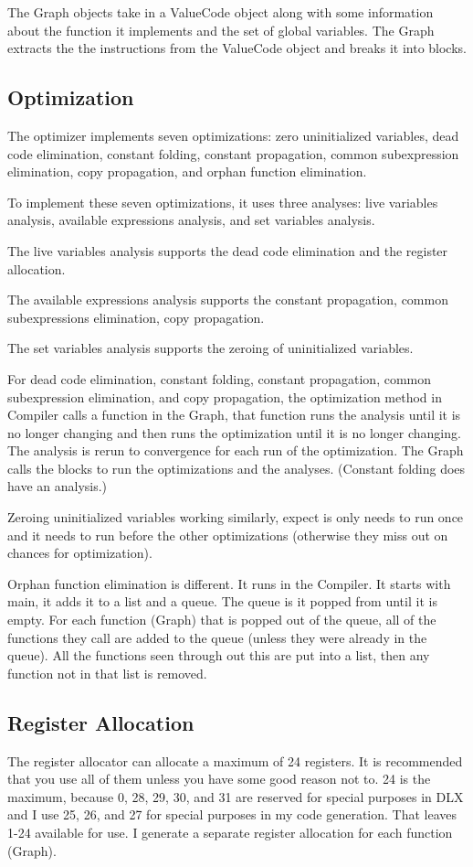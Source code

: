 The Graph objects take in a ValueCode object along with some information about the function it implements and the set of global variables. The Graph extracts the the instructions from the ValueCode object and breaks it into blocks. 

\subsection*{Optimization}
The optimizer implements seven optimizations: zero uninitialized variables, dead code elimination, constant folding, constant propagation, common subexpression elimination, copy propagation, and orphan function elimination. 

To implement these seven optimizations, it uses three analyses: live variables analysis, available expressions analysis, and set variables analysis. 

The live variables analysis supports the dead code elimination and the register allocation. 

The available expressions analysis supports the constant propagation, common subexpressions elimination, copy propagation. 

The set variables analysis supports the zeroing of uninitialized variables. 

For dead code elimination, constant folding, constant propagation, common subexpression elimination, and copy propagation, the optimization method in Compiler calls a function in the Graph, that function runs the analysis until it is no longer changing and then runs the optimization until it is no longer changing. The analysis is rerun to convergence for each run of the optimization. The Graph calls the blocks to run the optimizations and the analyses. (Constant folding does have an analysis.) 

Zeroing uninitialized variables working similarly, expect is only needs to run once and it needs to run before the other optimizations (otherwise they miss out on chances for optimization). 

Orphan function elimination is different. It runs in the Compiler. It starts with main, it adds it to a list and a queue. The queue is it popped from until it is empty. For each function (Graph) that is popped out of the queue, all of the functions they call are added to the queue (unless they were already in the queue). All the functions seen through out this are put into a list, then any function not in that list is removed. 

\subsection*{Register Allocation}
The register allocator can allocate a maximum of 24 registers. It is recommended that you use all of them unless you have some good reason not to. 24 is the maximum, because 0, 28, 29, 30, and 31 are reserved for special purposes in DLX and I use 25, 26, and 27 for special purposes in my code generation. That leaves 1-24 available for use. I generate a separate register allocation for each function (Graph). 

